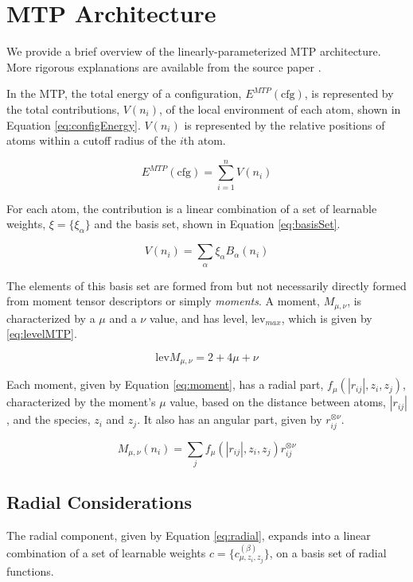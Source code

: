 \documentclass[9pt,twocolumn,twoside]{opticajnl}
\begin{document}
\section{MTP Architecture}
We provide a brief overview of the linearly-parameterized MTP architecture. More rigorous explanations are available from the source paper \cite{mtp}.

In the MTP, the total energy of a configuration, $E^{MTP} (\textrm{cfg}) $, is represented by the total contributions, $V(n_i)$, of the local environment of each atom, shown in Equation \ref{eq:configEnergy}.  $V(n_i)$ is represented by the relative positions of atoms within a cutoff radius of the $i$th atom.

\begin{equation} \label{eq:configEnergy}
  E^{MTP} (\textrm{cfg}) = \sum_{i=1}^{n} V(n_i)
\end{equation}

For each atom, the contribution is a linear combination of a set of learnable weights, $\xi = \{\xi_\alpha\}$ and the basis set, shown in Equation \ref{eq:basisSet}.

\begin{equation} \label{eq:basisSet}
  V(n_i) = \sum_{\alpha} \xi_\alpha   B_\alpha (n_i)
\end{equation}

The elements of this basis set are formed from but not necessarily directly formed from moment tensor descriptors or simply \textit{moments}. A moment, $M_{\mu,\nu}$,  is characterized by a $\mu$ and a $\nu$ value, and has level, $\textrm{lev}_{max}$, which is given by \ref{eq:levelMTP}.

\begin{equation} \label{eq:levelMTP}
  \textrm{lev}M_{\mu,\nu} = 2 + 4\mu + \nu
\end{equation}

Each moment, given by Equation \ref{eq:moment}, has a radial part, $f_\mu (|r_{ij}|,z_i,z_j) $, characterized by the moment's $\mu$ value,  based on the distance between atoms, $|r_{ij}|$, and the species, $z_i$ and $z_j$. It also has an angular part, given by $r_{ij} ^{\otimes \nu}$.

\begin{equation} \label{eq:moment}
  M_{\mu,\nu} (n_i)= \sum_{j} f_\mu (|r_{ij}|,z_i,z_j) r_{ij} ^{\otimes \nu}
\end{equation}

\subsection{Radial Considerations}
The radial component, given by Equation \ref{eq:radial}, expands into a linear combination of a set of learnable weights $c = \{c^{(\beta)} _ {\mu,z_i,z_j} \}$, on a basis set of radial functions.
\end{document}
